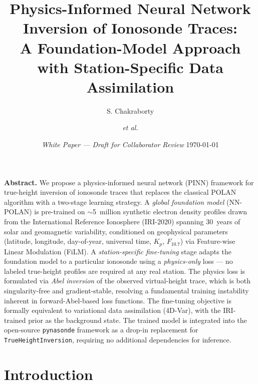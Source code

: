 \documentclass[11pt,twocolumn]{article}
\title{\textbf{Physics-Informed Neural Network Inversion of Ionosonde Traces:\\
A Foundation-Model Approach with Station-Specific Data Assimilation}
\vspace{-0.3cm}}
\author[1]{S. Chakraborty}
\author[1,2]{\textit{et al.}}
\affil[1]{Embry--Riddle Aeronautical University, Daytona Beach, FL, USA}
\affil[2]{Fourth State Communications, USA}
\date{\small \textit{White Paper — Draft for Collaborator Review} \quad \today}
\begin{document}
\maketitle
\thispagestyle{empty}

\begin{mdframed}[backgroundcolor=boxbg, linecolor=boxborder, linewidth=1pt,
                 innertopmargin=6pt, innerbottommargin=6pt,
                 innerleftmargin=8pt, innerrightmargin=8pt]
\textbf{Abstract.}
We propose a physics-informed neural network (PINN) framework for true-height
inversion of ionosonde traces that replaces the classical POLAN algorithm with a
two-stage learning strategy.
A \emph{global foundation model} (NN-POLAN) is pre-trained on $\sim$5~million
synthetic electron density profiles drawn from the International Reference
Ionosphere (IRI-2020) spanning 30~years of solar and geomagnetic variability,
conditioned on geophysical parameters (latitude, longitude, day-of-year,
universal time, $K_p$, $F_{10.7}$) via Feature-wise Linear Modulation (FiLM).
A \emph{station-specific fine-tuning} stage adapts the foundation model to a
particular ionosonde using a \emph{physics-only} loss — no labeled true-height
profiles are required at any real station.
The physics loss is formulated via \emph{Abel inversion} of the observed
virtual-height trace, which is both singularity-free and gradient-stable,
resolving a fundamental training instability inherent in forward-Abel-based loss
functions.
The fine-tuning objective is formally equivalent to variational data
assimilation (4D-Var), with the IRI-trained prior as the background state.
The trained model is integrated into the open-source \texttt{pynasonde}
framework as a drop-in replacement for \texttt{TrueHeightInversion},
requiring no additional dependencies for inference.
\end{mdframed}

\vspace{4pt}

\section{Introduction}
\end{document}
